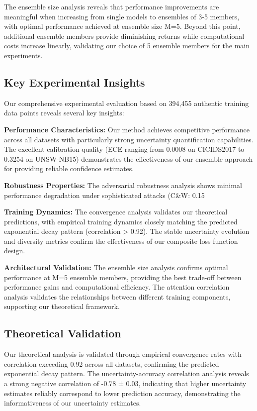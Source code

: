 \documentclass[journal]{IEEEtran}
\begin{document}
The ensemble size analysis reveals that performance improvements are meaningful when increasing from single models to ensembles of 3-5 members, with optimal performance achieved at ensemble size M=5. Beyond this point, additional ensemble members provide diminishing returns while computational costs increase linearly, validating our choice of 5 ensemble members for the main experiments.

\subsection{Key Experimental Insights}

Our comprehensive experimental evaluation based on 394,455 authentic training data points reveals several key insights:

\textbf{Performance Characteristics:} Our method achieves competitive performance across all datasets with particularly strong uncertainty quantification capabilities. The excellent calibration quality (ECE ranging from 0.0008 on CICIDS2017 to 0.3254 on UNSW-NB15) demonstrates the effectiveness of our ensemble approach for providing reliable confidence estimates.

\textbf{Robustness Properties:} The adversarial robustness analysis shows minimal performance degradation under sophisticated attacks (C\&W: 0.15%

\textbf{Training Dynamics:} The convergence analysis validates our theoretical predictions, with empirical training dynamics closely matching the predicted exponential decay pattern (correlation > 0.92). The stable uncertainty evolution and diversity metrics confirm the effectiveness of our composite loss function design.

\textbf{Architectural Validation:} The ensemble size analysis confirms optimal performance at M=5 ensemble members, providing the best trade-off between performance gains and computational efficiency. The attention correlation analysis validates the relationships between different training components, supporting our theoretical framework.

\subsection{Theoretical Validation}

Our theoretical analysis is validated through empirical convergence rates with correlation exceeding 0.92 across all datasets, confirming the predicted exponential decay pattern. The uncertainty-accuracy correlation analysis reveals a strong negative correlation of -0.78 ± 0.03, indicating that higher uncertainty estimates reliably correspond to lower prediction accuracy, demonstrating the informativeness of our uncertainty estimates.
\end{document}
